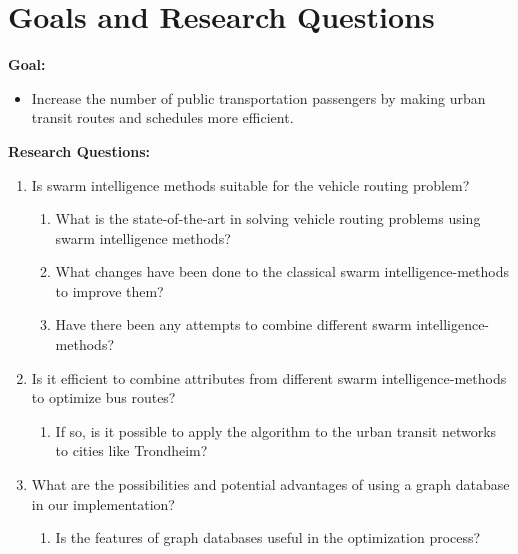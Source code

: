 \section{Goals and Research Questions}
\textbf{Goal:}
\begin{itemize}
\item \label{itm:goal} Increase the number of public transportation passengers by making urban transit routes and schedules more efficient.
\end{itemize}
\textbf{Research Questions:}
\begin{enumerate}
  \item Is swarm intelligence methods suitable for the vehicle routing problem?
    \begin{enumerate}
    \item What is the state-of-the-art in solving vehicle routing problems using swarm intelligence methods?
    \item What changes have been done to the classical swarm intelligence-methods to improve them?
    \item Have there been any attempts to combine different swarm intelligence-methods?
  \end{enumerate}
 
\item Is it efficient to combine attributes from different swarm intelligence-methods to optimize bus routes?
    \begin{enumerate}
    \item If so, is it possible to apply the algorithm to the urban transit networks to cities like Trondheim?
  \end{enumerate}

\item What are the possibilities and potential advantages of using a graph database in our implementation?
\begin{enumerate}
\item Is the features of graph databases useful in the optimization process? 
\end{enumerate}
\end{enumerate}
